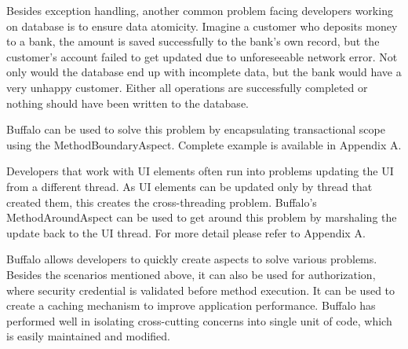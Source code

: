 Besides exception handling, another common problem facing developers working on database is to ensure data atomicity. Imagine a customer who deposits money to a bank, the amount is saved successfully to the bank’s own record, but the customer’s account failed to get updated due to unforeseeable network error. Not only would the database end up with incomplete data, but the bank would have a very unhappy customer. Either all operations are successfully completed or nothing should have been written to the database.

Buffalo can be used to solve this problem by encapsulating transactional scope using the MethodBoundaryAspect. Complete example is available in Appendix A.

Developers that work with UI elements often run into problems updating the UI from a different thread. As UI elements can be updated only by thread that created them, this creates the cross-threading problem. Buffalo’s MethodAroundAspect can be used to get around this problem by marshaling the update back to the UI thread. For more detail please refer to Appendix A.

Buffalo allows developers to quickly create aspects to solve various problems. Besides the scenarios mentioned above, it can also be used for authorization, where security credential is validated before method execution. It can be used to create a caching mechanism to improve application performance. Buffalo has performed well in isolating cross-cutting concerns into single unit of code, which is easily maintained and modified.
